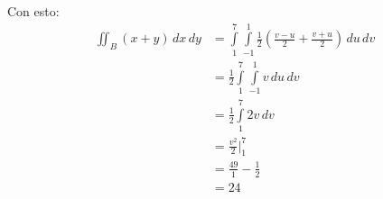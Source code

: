     Con esto:
    \begin{align*}
        \iint_B (x+y) \, dx \, dy &= \int \limits_{1}^{7} \int \limits_{-1}^{1} \frac{1}{2}\left(\frac{v - u}{2} + \frac{v + u}{2} \right) \, du \, dv \\
        &=\frac{1}{2} \int \limits_{1}^{7} \int \limits_{-1}^{1} v \, du \, dv \\
        &= \frac{1}{2}\int \limits_{1}^{7} 2v \,dv \\
        &= \frac{v^2}{2} \Big|^{7}_{1} \\
        &= \frac{49}{1} - \frac{1}{2} \\
        &= 24
    \end{align*}
